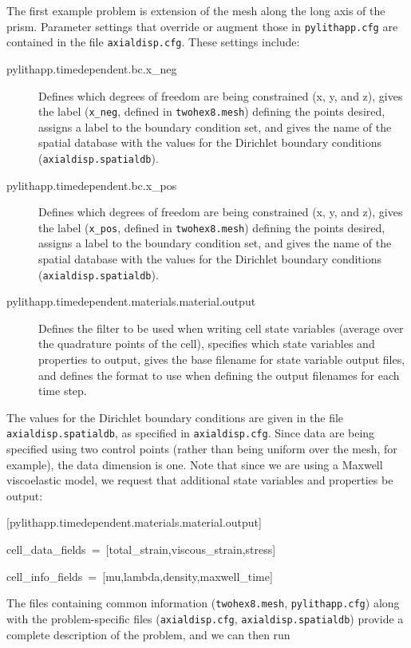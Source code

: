 The first example problem is extension of the mesh along the long
axis of the prism. Parameter settings that override or augment those
in \texttt{pylithapp.cfg} are contained in the file \texttt{axialdisp.cfg}.
These settings include:
\begin{description}
\item [{pylithapp.timedependent.bc.x\_neg}] Defines which degrees of freedom
are being constrained (x, y, and z), gives the label (\texttt{x\_neg},
defined in \texttt{twohex8.mesh}) defining the points desired, assigns
a label to the boundary condition set, and gives the name of the spatial
database with the values for the Dirichlet boundary conditions (\texttt{axialdisp.spatialdb}).
\item [{pylithapp.timedependent.bc.x\_pos}] Defines which degrees of freedom
are being constrained (x, y, and z), gives the label (\texttt{x\_pos},
defined in \texttt{twohex8.mesh}) defining the points desired, assigns
a label to the boundary condition set, and gives the name of the spatial
database with the values for the Dirichlet boundary conditions (\texttt{axialdisp.spatialdb}).
\item [{pylithapp.timedependent.materials.material.output}] Defines the
filter to be used when writing cell state variables (average over
the quadrature points of the cell), specifies which state variables
and properties to output, gives the base filename for state variable
output files, and defines the format to use when defining the output
filenames for each time step.
\end{description}
The values for the Dirichlet boundary conditions are given in the
file \texttt{axialdisp.spatialdb}, as specified in \texttt{axialdisp.cfg}.
Since data are being specified using two control points (rather than
being uniform over the mesh, for example), the data dimension is one.
Note that since we are using a Maxwell viscoelastic model, we request
that additional state variables and properties be output:
\begin{lyxcode}
{[}pylithapp.timedependent.materials.material.output{]}

cell\_data\_fields~=~{[}total\_strain,viscous\_strain,stress{]}

cell\_info\_fields~=~{[}mu,lambda,density,maxwell\_time{]}
\end{lyxcode}
The files containing common information (\texttt{twohex8.mesh}, \texttt{pylithapp.cfg})
along with the problem-specific files (\texttt{axialdisp.cfg}, \texttt{axialdisp.spatialdb})
provide a complete description of the problem, and we can then run
